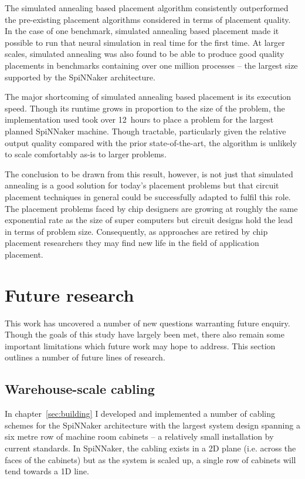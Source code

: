 		The simulated annealing based placement algorithm consistently outperformed
		the pre-existing placement algorithms considered in terms of placement
		quality.  In the case of one benchmark, simulated annealing based placement
		made it possible to run that neural simulation in real time for the first
		time.  At larger scales, simulated annealing was also found to be able to
		produce good quality placements in benchmarks containing over one million
		processes -- the largest size supported by the SpiNNaker architecture.
		
		The major shortcoming of simulated annealing based placement is its
		execution speed. Though its runtime grows in proportion to the size of the
		problem, the implementation used took over 12~hours to place a problem for
		the largest planned SpiNNaker machine. Though tractable, particularly given
		the relative output quality compared with the prior state-of-the-art, the
		algorithm is unlikely to scale comfortably as-is to larger problems.
		
		The conclusion to be drawn from this result, however, is not just that
		simulated annealing is a good solution for today's placement problems but
		that circuit placement techniques in general could be successfully adapted
		to fulfil this role. The placement problems faced by chip designers are
		growing at roughly the same exponential rate as the size of super computers
		but circuit designs hold the lead in terms of problem size. Consequently,
		as approaches are retired by chip placement researchers they may find new
		life in the field of application placement.
		
	\section{Future research}
		
		This work has uncovered a number of new questions warranting future
		enquiry. Though the goals of this study have largely been met, there also
		remain some important limitations which future work may hope to address.
		This section outlines a number of future lines of research.
		
		\subsection{Warehouse-scale cabling}
			
			In chapter~\ref{sec:building} I developed and implemented a number of
			cabling schemes for the SpiNNaker architecture with the largest system
			design spanning a six metre row of machine room cabinets -- a relatively
			small installation by current standards. In SpiNNaker, the cabling exists
			in a 2D plane (i.e. across the faces of the cabinets) but as the system
			is scaled up, a single row of cabinets will tend towards a 1D line.
			
